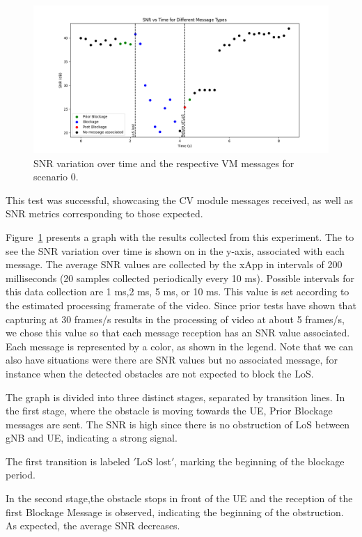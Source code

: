 \begin{figure}[H]
    \centering
    \includegraphics[width=\linewidth]{figures/results_0}
    \caption{SNR variation over time and the respective VM messages for scenario 0.}
    \label{fig:results_0}
\end{figure}


This test was successful, showcasing the CV module messages received, as well as SNR metrics corresponding to those expected.

Figure~\ref{fig:results_0} presents a graph with the results collected from this experiment.
The to see the SNR variation over time is shown on in the y-axis, associated with each message.
The average SNR values are collected by the xApp in intervals of 200 milliseconds (20 samples collected periodically every 10 ms).
Possible intervals for this data collection are 1 ms,2 ms, 5 ms, or 10 ms.
This value is set according to the estimated processing framerate of the video.
Since prior tests have shown that capturing at 30 frames/s results in the processing of video at about 5 frames/s, we chose this value so that each message reception has an SNR value associated.
Each message is represented by a color, as shown in the legend.
Note that we can also have situations were there are SNR values but no associated message, for instance when the detected obstacles are not expected to block the LoS\@.

The graph is divided into three distinct stages, separated by transition lines.
In the first stage, where the obstacle is moving towards the UE, Prior Blockage messages are sent.
The SNR is high  since there is no obstruction of LoS between gNB and UE, indicating a strong signal.

The first transition is labeled \('\)LoS lost\('\), marking the beginning of the blockage period.

In the second stage,the obstacle stops in front of the UE and the reception of the first Blockage Message is observed, indicating the beginning of the obstruction.
As expected, the average SNR decreases.

